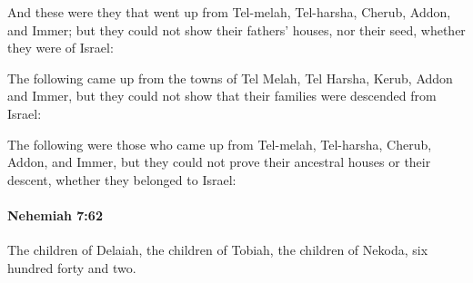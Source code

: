 			\begin{versebox}
					\item[BHS] 
					\item[LXX] 
					\item[ASV] And these were they that went up from Tel-melah, Tel-harsha, Cherub, Addon, and Immer; but they could not show their fathers' houses, nor their seed, whether they were of Israel:
					\item[NIV] The following came up from the towns of Tel Melah, Tel Harsha, Kerub, Addon and Immer, but they could not show that their families were descended from Israel:
					\item[NRSV] The following were those who came up from Tel-melah, Tel-harsha, Cherub, Addon, and Immer, but they could not prove their ancestral houses or their descent, whether they belonged to Israel:
			\end{versebox}

		\paragraph{Nehemiah 7:62} %
			\label{NEHEMIAH-7-62}

			The children of Delaiah, the children of Tobiah, the children of Nekoda, six hundred forty and two.

